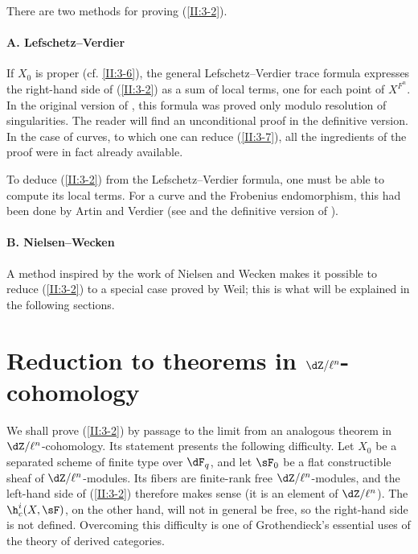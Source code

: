 There are two methods for proving (\ref{II:3-2}).



\paragraph{A. Lefschetz--Verdier}
If $X_0$ is proper (cf. \ref{II:3-6}), the general Lefschetz--Verdier trace
formula expresses the right-hand side of (\ref{II:3-2}) as a sum of local
terms, one for each point of $X^{F^n}$. In the original version of
\cite{sga5}, this formula was proved only modulo resolution of singularities.
The reader will find an unconditional proof in the definitive version. In
the case of curves, to which one can reduce (\ref{II:3-7}), all the
ingredients of the proof were in fact already available.

To deduce (\ref{II:3-2}) from the Lefschetz--Verdier formula, one must be
able to compute its local terms. For a curve and the Frobenius endomorphism,
this had been done by Artin and Verdier (see \cite{ve67} and the definitive version of \cite{sga5}).



\paragraph{B. Nielsen--Wecken}
A method inspired by the work of Nielsen and Wecken makes it possible to
reduce (\ref{II:3-2}) to a special case proved by Weil; this is what will be
explained in the following sections.











\section{Reduction to theorems in \texorpdfstring{$\dZ/\ell^n$}{Z/l n}-cohomology}\label{II:4}

We shall prove (\ref{II:3-2}) by passage to the limit from an analogous
theorem in $\dZ/\ell^n$-cohomology. Its statement presents the following
difficulty. Let $X_0$ be a separated scheme of finite type over $\dF_q$, and
let $\sF_0$ be a flat constructible sheaf of $\dZ/\ell^n$-modules. Its fibers
are finite-rank free $\dZ/\ell^n$-modules, and the left-hand side of
(\ref{II:3-2}) therefore makes sense (it is an element of $\dZ/\ell^n$).
The $\h_c^i(X,\sF)$, on the other hand, will not in general be free, so the
right-hand side is not defined. Overcoming this difficulty is one of
Grothendieck's essential uses of the theory of derived categories.






